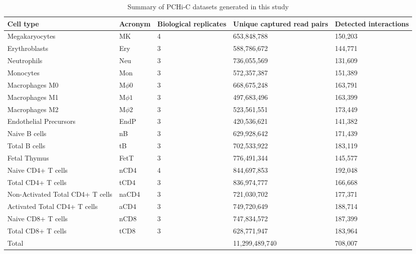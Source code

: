 {\begin{table}[ht]
\caption{Summary of PCHi-C datasets generated in this study}
\centering
{\tabulinesep=1.2mm
\begin{tabular}{| L{3cm} | C{2cm} | C{2cm} | C{2.6cm} | C{2cm} | }
  \hline
 Cell type & Acronym & Biological replicates & Unique captured read pairs & Detected interactions \\
  \hline
 Megakaryocytes & MK &   4 & 653,848,788 & 150,203 \\
 Erythroblasts & Ery &   3 & 588,786,672 & 144,771 \\
 Neutrophils & Neu &   3 & 736,055,569 & 131,609 \\
 Monocytes & Mon &   3 & 572,357,387 & 151,389 \\
 Macrophages M0 & M$\phi0$ &   3 & 668,675,248 & 163,791 \\
 Macrophages M1 & M$\phi1$ &   3 & 497,683,496 & 163,399 \\
 Macrophages M2 & M$\phi2$ &   3 & 523,561,551 & 173,449 \\
 Endothelial Precursors & EndP &   3 & 420,536,621 & 141,382 \\
 Naive B cells & nB &   3 & 629,928,642 & 171,439 \\
 Total B cells & tB &   3 & 702,533,922 & 183,119 \\
 Fetal Thymus & FetT &   3 & 776,491,344 & 145,577 \\
 Naive CD4+ T cells & nCD4 &   4 & 844,697,853 & 192,048 \\
 Total CD4+ T cells & tCD4 &   3 & 836,974,777 & 166,668 \\
 Non-Activated Total CD4+ T cells & naCD4 &   3 & 721,030,702 & 177,371 \\
 Activated Total CD4+ T cells & aCD4 &   3 & 749,720,649 & 188,714 \\
 Naive CD8+ T cells & nCD8 &   3 & 747,834,572 & 187,399 \\
 Total CD8+ T cells & tCD8 &   3 & 628,771,947 & 183,964 \\
 \hline
 \hline
 Total & & & 11,299,489,740 & 708,007 \\
 \hline
\end{tabular}}
\label{tab:pints}
\end{table}
\addtocounter{footnote}{+1}
}
